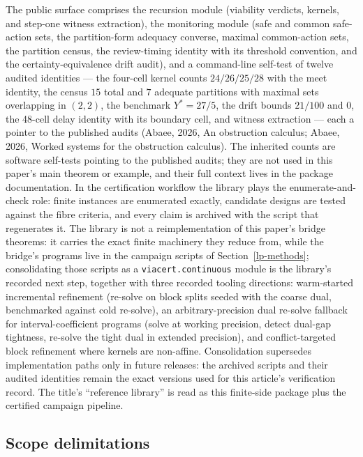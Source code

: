 \documentclass[10pt,twocolumn]{article}
\theoremstyle{plain}
\theoremstyle{definition}
\theoremstyle{remark}
\begin{document}
The public surface comprises the recursion module (viability verdicts,
kernels, and step-one witness extraction), the monitoring module (safe and
common safe-action sets, the partition-form adequacy converse, maximal
common-action sets, the partition census, the review-timing identity with
its threshold convention, and the certainty-equivalence drift audit), and a
command-line self-test of twelve audited identities --- the four-cell kernel
counts \(24/26/25/28\) with the meet identity, the census \(15\) total and
\(7\) adequate partitions with maximal sets overlapping in \((2,2)\), the
benchmark \(Y^{*} = 27/5\), the drift bounds \(21/100\) and \(0\), the
48-cell delay identity with its boundary cell, and witness extraction ---
each a pointer to the published audits (Abaee, 2026, An obstruction calculus; Abaee, 2026, Worked systems for the obstruction calculus). The
inherited counts are software self-tests pointing to the published audits;
they are not used in this paper's main theorem or example, and their full
context lives in the package documentation. In the certification workflow
the library plays the enumerate-and-check role:
finite instances are enumerated exactly, candidate designs are tested
against the fibre criteria, and every claim is archived with the script that
regenerates it. The library is not a reimplementation of this paper's bridge theorems: it carries the exact finite machinery they reduce from, while the bridge's programs live in the campaign scripts of Section~\ref{lp-methods}; consolidating those scripts as a \texttt{viacert.continuous} module is the library's recorded next step, together with three recorded tooling directions: warm-started incremental refinement (re-solve on block splits seeded with the coarse dual, benchmarked against cold re-solve), an arbitrary-precision dual re-solve fallback for interval-coefficient programs (solve at working precision, detect dual-gap tightness, re-solve the tight dual in extended precision), and conflict-targeted block refinement where kernels are non-affine. Consolidation supersedes implementation paths only in future releases:
the archived scripts and their audited identities remain the exact versions
used for this article's verification record. The title's ``reference
library'' is read as this finite-side package plus the certified campaign
pipeline.

\subsection{Scope delimitations}\label{lp-scope}
\end{document}
